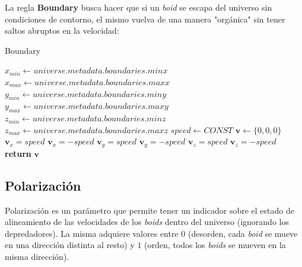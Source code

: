 \documentclass[a4paper]{article}
\begin{document}
                La regla \textbf{Boundary} busca hacer que si un \textit{boid} se escapa del universo sin condiciones de contorno, el mismo vuelva de una manera "orgánica" sin tener saltos abruptos en la velocidad:

                \pagebreak

                \begin{algorithm}
                    \caption{Boundary}\label{pseudo:boundary}
                    \begin{algorithmic}[1]
                            \State $x_{min} \gets universe.metadata.boundaries.minx$
                            \State $x_{max} \gets universe.metadata.boundaries.maxx$
                            \State $y_{min} \gets universe.metadata.boundaries.miny$
                            \State $y_{max} \gets universe.metadata.boundaries.maxy$
                            \State $z_{min} \gets universe.metadata.boundaries.minz$
                            \State $z_{max} \gets universe.metadata.boundaries.maxz$
                            \State $speed \gets CONST$
                            \State $\bm{v} \gets \{0, 0, 0\}$
                                \State $\bm{v}_x = speed$
                            \EndIf
                                \State $\bm{v}_x = -speed$
                            \EndIf
                                \State $\bm{v}_y = speed$
                            \EndIf
                                \State $\bm{v}_y = -speed$
                            \EndIf
                                \State $\bm{v}_z = speed$
                            \EndIf
                                \State $\bm{v}_z = -speed$
                            \EndIf
                            \State \textbf{return} $\bm{v}$
                        \EndProcedure
                    \end{algorithmic}
                \end{algorithm}

        \subsection{Polarización}
            Polarización es un parámetro que permite tener un indicador sobre el estado de alineamiento de las velocidades de los \textit{boids} dentro del universo (ignorando los depredadores). La misma adquiere valores entre $0$ (desorden, cada \textit{boid} se mueve en una dirección distinta al resto) y $1$ (orden, todos los \textit{boids} se mueven en la misma dirección).
\end{document}
